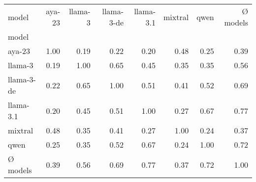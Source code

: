 \begin{tabular}{lrrrrrrr}
\toprule
model & aya-23 & llama-3 & llama-3-de & llama-3.1 & mixtral & qwen & Ø models \\
model &  &  &  &  &  &  &  \\
\midrule
aya-23 & 1.00 & 0.19 & 0.22 & 0.20 & 0.48 & 0.25 & 0.39 \\
llama-3 & 0.19 & 1.00 & 0.65 & 0.45 & 0.35 & 0.35 & 0.56 \\
llama-3-de & 0.22 & 0.65 & 1.00 & 0.51 & 0.41 & 0.52 & 0.69 \\
llama-3.1 & 0.20 & 0.45 & 0.51 & 1.00 & 0.27 & 0.67 & 0.77 \\
mixtral & 0.48 & 0.35 & 0.41 & 0.27 & 1.00 & 0.24 & 0.37 \\
qwen & 0.25 & 0.35 & 0.52 & 0.67 & 0.24 & 1.00 & 0.72 \\
Ø models & 0.39 & 0.56 & 0.69 & 0.77 & 0.37 & 0.72 & 1.00 \\
\bottomrule
\end{tabular}
